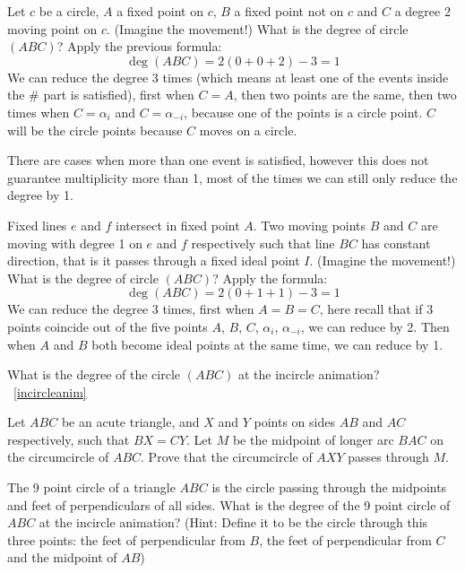 \documentclass[a4paper]{article}
\begin{document}
\begin{example}
    Let $c$ be a circle, $A$ a fixed point on $c$, $B$ a fixed point not on $c$ and $C$ a degree 2 moving point on $c$. (Imagine the movement!) What is the degree of circle $(ABC)$? 
    Apply the previous formula:
    $$\deg (ABC)=2(0+0+2)-3=1$$
    We can reduce the degree 3 times (which means at least one of the events inside the $\#$ part is satisfied), first when $C=A$, then two points are the same, then two times when $C=\alpha_i$ and $C=\alpha_{-i}$, because one of the points is a circle point. $C$ will be the circle points because $C$ moves on a circle.
\end{example}
\begin{remark}
    There are cases when more than one event is satisfied, however this does not guarantee multiplicity more than 1, most of the times we can still only reduce the degree by 1.
\end{remark}
\begin{example}
    Fixed lines $e$ and $f$ intersect in fixed point $A$. Two moving points $B$ and $C$ are moving with degree 1 on $e$ and $f$ respectively such that line $BC$ has constant direction, that is it passes through a fixed ideal point $I$. (Imagine the movement!) What is the degree of circle $(ABC)$?
    Apply the formula:
    $$\deg (ABC)=2(0+1+1)-3=1$$
    We can reduce the degree 3 times, first when $A=B=C$, here recall that if 3 points coincide out of the five points $A$, $B$, $C$, $\alpha_i$, $\alpha_{-i}$, we can reduce by 2. Then when $A$ and $B$ both become ideal points at the same time, we can reduce by 1.
\end{example}
\begin{exercise}
    What is the degree of the circle $(ABC)$ at the incircle animation? ~\ref{incircleanim}
\end{exercise}
\begin{exercise}
    Let $ABC$ be an acute triangle, and $X$ and $Y$ points on sides $AB$ and $AC$ respectively, such that $BX=CY$. Let $M$ be the midpoint of longer arc $BAC$ on the circumcircle of $ABC$. Prove that the circumcircle of $AXY$ passes through $M$.
\end{exercise}

\begin{exercise}
    The 9 point circle of a triangle $ABC$ is the circle passing through the midpoints and feet of perpendiculars of all sides.
    What is the degree of the 9 point circle of $ABC$ at the incircle animation? (Hint: Define it to be the circle through this three points: the feet of perpendicular from $B$, the feet of perpendicular from $C$ and the midpoint of $AB$)

\end{exercise}
\end{document}
